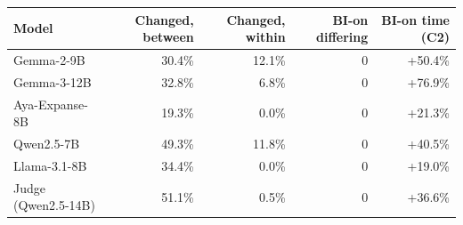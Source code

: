 \begin{tabular}{lrrrr}
\toprule
Model & Changed, between & Changed, within & BI-on differing & BI-on time (C2) \\
\midrule
Gemma-2-9B & 30.4\% & 12.1\% & 0 & +50.4\% \\
Gemma-3-12B & 32.8\% & 6.8\% & 0 & +76.9\% \\
Aya-Expanse-8B & 19.3\% & 0.0\% & 0 & +21.3\% \\
Qwen2.5-7B & 49.3\% & 11.8\% & 0 & +40.5\% \\
Llama-3.1-8B & 34.4\% & 0.0\% & 0 & +19.0\% \\
\midrule
Judge (Qwen2.5-14B) & 51.1\% & 0.5\% & 0 & +36.6\% \\
\bottomrule
\end{tabular}
